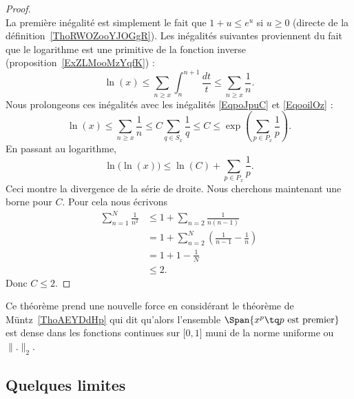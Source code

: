 \begin{proof}
\begin{equation}
	\end{equation}
	La première inégalité est simplement le fait que \( 1+u\leq e^u\) si \( u\geq 0\) (directe de la définition~\ref{ThoRWOZooYJOGgR}). Les inégalités suivantes proviennent du fait que le logarithme est une primitive de la fonction inverse (proposition~\ref{ExZLMooMzYqfK}) :
	\begin{equation}
		\ln(x)\leq \sum_{n\geq x}\int_{n}^{n+1}\frac{dt}{ t }\leq \sum_{n\geq x}\frac{1}{ n }.
	\end{equation}
	Nous prolongeons ces inégalités avec les inégalités \eqref{EqpoJpuC} et \eqref{EqooilOz} :
	\begin{equation}
		\ln(x)\leq \sum_{n\geq x}\frac{1}{ n }\leq C\sum_{q\in S_x}\frac{1}{ q }\leq C\leq \exp\left( \sum_{p\in P_x}\frac{1}{ p } \right).
	\end{equation}
	En passant au logarithme,
	\begin{equation}
		\ln\big( \ln(x) \big)\leq\ln(C)+\sum_{p\in P_x}\frac{1}{ p }.
	\end{equation}
	Ceci montre la divergence de la série de droite. Nous cherchons maintenant une borne pour \( C\). Pour cela nous écrivons
	\begin{subequations}
		\begin{align}
			\sum_{n=1}^N\frac{1}{ n^2 } & \leq 1+\sum_{n=2}\frac{1}{ n(n-1) }                         \\
			                            & =1+\sum_{n=2}^N\left( \frac{1}{ n-1 }-\frac{1}{ n } \right) \\
			                            & =1+1-\frac{1}{ N }                                          \\
			                            & \leq 2.
		\end{align}
	\end{subequations}
	Donc \( C\leq 2\).
\end{proof}
Ce théorème prend une nouvelle force en considérant le théorème de Müntz~\ref{ThoAEYDdHp} qui dit qu'alors l'ensemble \( \Span\{ x^p\tq  p\text{ est premier} \}\) est dense dans les fonctions continues sur \( \mathopen[ 0 , 1 \mathclose]\) muni de la norme uniforme ou \( \| . \|_2\).

\subsection{Quelques limites}

